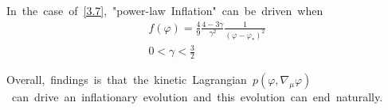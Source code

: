 In\ the\ case\ of\ \eqref{3.7},\ "power-law\ Inflation"\ can\ be\ driven\ when
\begin{align}
    f(\varphi)=\frac{4}{9}\frac{4-3\gamma}{\gamma^2}\frac{1}{(\varphi-\varphi_*)^2}\\
    0<\gamma<\frac{3}{2}
\end{align}

Overall,\ findings\ is\ that\ the\ kinetic\ Lagrangian\ $p(\varphi,\nabla_{\mu}\varphi)$\ can\ drive\ an\ inflationary\ evolution\ and\ this\ evolution\ can\ end\ naturally.
